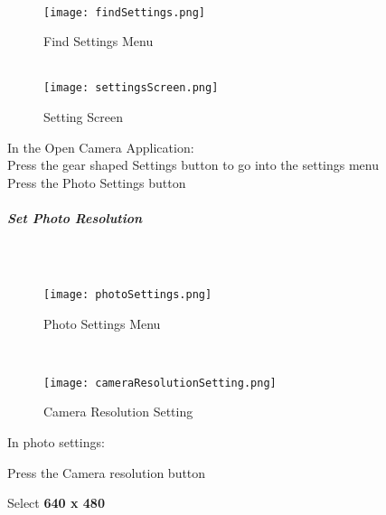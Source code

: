 \documentclass[class=article , crop=false, titlepage, twoside, multi={itemize, figure, verbatim}, float=false]{standalone}
\begin{document}
\subparagraph*{\texorpdfstring{\\}{}}
\begin{wrapfigure}{r}{0.5\textwidth}
\centering
\texttt{[image: findSettings.png]}
\caption{Find Settings Menu}
\vspace{.25in}
\HRule \\[.4cm] %
\vspace{.25in}
\texttt{[image: settingsScreen.png]}
\caption{Setting Screen}
\end{wrapfigure}
In the Open Camera Application:\\
\vspace{1in}
\noindent Press the gear shaped \Large Settings \normalsize button to go into the settings menu\\
\vspace{3in}
\noindent Press the \Large Photo Settings \normalsize button\\
\clearpage
\subparagraph*{Set Photo Resolution}
\subparagraph*{\\}
\begin{wrapfigure}{r}{0.5\textwidth}
\centering
\texttt{[image: photoSettings.png]}
\caption{Photo Settings Menu}
\vspace{.25in}

\HRule \\[.4cm] %
\vspace{.25in}

\texttt{[image: cameraResolutionSetting.png]}
\caption{Camera Resolution Setting}
\end{wrapfigure}
In \Large photo settings:
\vspace{1in}

\noindent Press the \Large Camera resolution \normalsize button\\
\vspace{3in}

\noindent Select \textbf{\LARGE 640 x 480}\\
\clearpage
\end{document}
